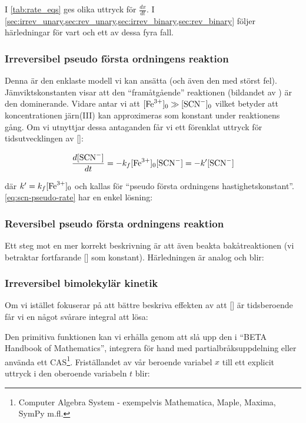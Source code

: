 

I \cref{tab:rate_eqs} ges olika uttryck för $\frac{dx}{dt}$. I
\cref{sec:irrev_unary,sec:rev_unary,sec:irrev_binary,sec:rev_binary} 
följer härledningar för vart och ett av dessa fyra fall. 


\subsubsection{Irreversibel pseudo första ordningens reaktion}
\label{sec:irrev_unary}
Denna är den enklaste modell vi kan ansätta (och även den med störst fel).
Jämviktskonstanten visar att den ``framåtgående'' reaktionen (bildandet av )
är den dominerande. Vidare antar vi att $[\ce{Fe^3+}]_0 \gg [\ce{SCN-}]_0$ vilket
betyder att koncentrationen järn(III) kan approximeras som konstant under
reaktionens gång. Om vi utnyttjar dessa antaganden får vi ett förenklat
uttryck för tidsutvecklingen av []:

\begin{equation}
  \label{eq:scn-pseudo-rate}
  \frac{d[\ce{SCN-}]}{dt} = -k_f[\ce{Fe^3+}]_0[\ce{SCN-}] = -k'[\ce{SCN-}]
\end{equation}

där $k' = k_f[\ce{Fe^3+}]_0$ och kallas för ``pseudo första ordningens
hastighetskonstant''. \cref{eq:scn-pseudo-rate} har en enkel lösning: 



\subsubsection{Reversibel pseudo första ordningens reaktion}
\label{sec:rev_unary}
Ett steg mot en mer korrekt beskrivning är att även beakta
bakåtreaktionen (vi betraktar fortfarande [] som
konstant). Härledningen är analog och blir:




\subsubsection{Irreversibel bimolekylär kinetik}
\label{sec:irrev_binary}
Om vi istället fokuserar på att bättre beskriva effekten av att
[] är tidsberoende får vi en något svårare integral att lösa:



Den primitiva funktionen kan vi erhålla genom att slå upp den i ``BETA Handbook of
Mathematics'', integrera för hand med partialbråksuppdelning eller
använda ett CAS\footnote{  Computer Algebra System -   exempelvis
  Mathematica, Maple, Maxima, SymPy m.fl.}. Friställandet av vår beroende
variabel $x$ till ett explicit uttryck i den oberoende variabeln $t$
blir:

